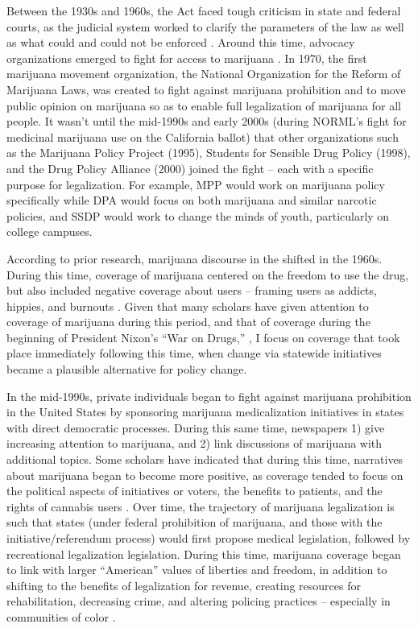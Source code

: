 Between the 1930s and 1960s, the Act faced tough criticism in state and federal courts, as the judicial system worked to clarify the parameters of the law as well as what could and could not be enforced \citep{bonnie_and_whitebread_1970,mosher_and_akins_2019}. Around this time, advocacy organizations emerged to fight for access to marijuana \citep{newhart_and_dolphin_2018}. In 1970, the first marijuana movement organization, the National Organization for the Reform of Marijuana Laws, was created to fight against marijuana prohibition and to move public opinion on marijuana so as to enable full legalization of marijuana for all people. It wasn't until the mid-1990s and early 2000s (during NORML's fight for medicinal marijuana use on the California ballot) that other organizations such as the Marijuana Policy Project (1995), Students for Sensible Drug Policy (1998), and the Drug Policy Alliance (2000) joined the fight -- each with a specific purpose for legalization. For example, MPP would work on marijuana policy specifically while DPA would focus on both marijuana and similar narcotic policies, and SSDP would work to change the minds of youth, particularly on college campuses. 

According to prior research, marijuana discourse in the shifted in the 1960s. During this time, coverage of marijuana centered on the freedom to use the drug, but also included negative coverage about users -- framing users as addicts, hippies, and burnouts \citep{mosher_and_akins_2019}. Given that many scholars have given attention to coverage of marijuana during this period, and that of coverage during the beginning of President Nixon's ``War on Drugs,'' \citep{bonnie_and_whitebread_1970,mosher_and_akins_2019,alexander_2010,caulkins_et_al_2012}, I focus on coverage that took place immediately following this time, when change via statewide initiatives became a plausible alternative for policy change. 

In the mid-1990s, private individuals began to fight against marijuana prohibition in the United States by sponsoring marijuana medicalization initiatives in states with direct democratic processes. During this same time, newspapers 1) give increasing attention to marijuana, and 2) link discussions of marijuana with additional topics. Some scholars have indicated that during this time, narratives about marijuana began to become more positive, as coverage tended to focus on the political aspects of initiatives or voters, the benefits to patients, and the rights of cannabis users \citep{newhart_and_dolphin_2018,mosher_and_akins_2019,bonnie_and_whitebread_1970}. Over time, the trajectory of marijuana legalization is such that states (under federal prohibition of marijuana, and those with the initiative/referendum process) would first propose medical legislation, followed by recreational legalization legislation. During this time, marijuana coverage began to link with larger ``American'' values of liberties and freedom, in addition to shifting to the benefits of legalization for revenue, creating resources for rehabilitation, decreasing crime, and altering policing practices -- especially in communities of color \citep{mosher_and_akins_2019,newhart_and_dolphin_2018}.

